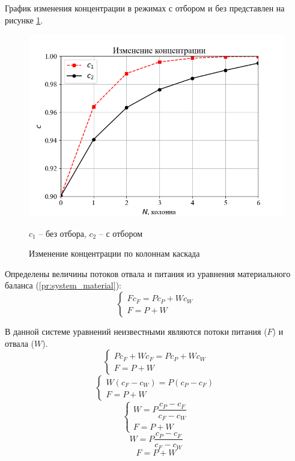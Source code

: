 График изменения концентрации в режимах с отбором и без представлен на рисунке \ref{fig:concentraion_change}.
\begin{figure}[hbtp]
    \centering
    \captionsetup{justification=centering}
    \includegraphics[scale=1]{latex/figures/concentration_change.png}
    \caption{Изменение концентрации по колоннам каскада}
    $c_{1}$ -- без отбора, $c_{2}$ -- с отбором
    \label{fig:concentraion_change}
\end{figure}

Определены величины потоков отвала и питания из уравнения материального баланса (\ref{pr:system_material}):
\begin{equation}\label{pr:system_material}
    \begin{cases}
    Fc_{F} = Pc_{P} + Wc_{W}\\
    F = P + W
    \end{cases}
\end{equation}

В данной системе уравнений неизвестными являются потоки питания ($F$) и отвала ($W$).
\begin{equation*}
    \begin{cases}
    Pc_{F} + Wc_{F} = Pc_{P} + Wc_{W}\\
    F = P + W
    \end{cases}
\end{equation*}
\begin{equation*}
    \begin{cases}
    W(c_{F} - c_{W}) = P(c_{P} - c_{F})\\
    F = P + W
    \end{cases}
\end{equation*}
\begin{equation*}
    \begin{cases}
    W = P\dfrac{c_{P} - c_{F}}{c_{F} - c_{W}}\\
    F = P + W
    \end{cases}
\end{equation*}
\begin{equation}
    W = P\dfrac{c_{P} - c_{F}}{c_{F} - c_{W}}
\end{equation}
\begin{equation}
    F = P + W
\end{equation}

